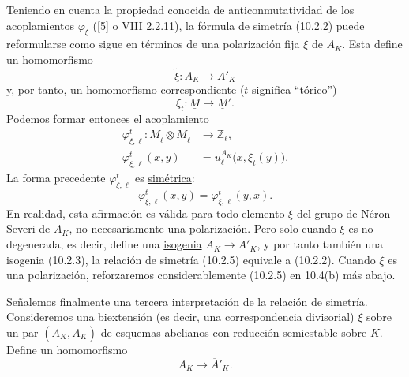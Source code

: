 Teniendo en cuenta la propiedad conocida de anticonmutatividad de los
acoplamientos $\varphi_\xi$ ([5] o VIII 2.2.11), la fórmula de simetría
(10.2.2) puede reformularse como sigue en términos de una polarización
fija $\xi$ de $A_K$. Esta define un homomorfismo
\begin{equation*}
\widetilde\xi:A_K\longrightarrow A'_K
\end{equation*}
y, por tanto, un homomorfismo correspondiente ($t$ significa
``tórico'')
\begin{equation}\tag{10.2.3}
\xi_t:\underline M\longrightarrow\underline M'.
\end{equation}
Podemos formar entonces el acoplamiento
\begin{equation}\tag{10.2.4}
\begin{aligned}
\varphi^t_{\xi,\ell}:\underline M_\ell\otimes\underline M_\ell
 &\longrightarrow\mathbb Z_\ell,\\
\varphi^t_{\xi,\ell}(x,y)&=u_\ell^{A_K}\bigl(x,\xi_t(y)\bigr).
\end{aligned}
\end{equation}
La forma precedente $\varphi^t_{\xi,\ell}$ es \underline{simétrica}:
\begin{equation}\tag{10.2.5}
\varphi^t_{\xi,\ell}(x,y)=\varphi^t_{\xi,\ell}(y,x).
\end{equation}
En realidad, esta afirmación es válida para todo elemento $\xi$ del
grupo de Néron--Severi de $A_K$, no necesariamente una polarización.
Pero solo cuando $\xi$ es no degenerada, es decir, define una
\underline{isogenia} $A_K\longrightarrow A'_K$, y por tanto también
una isogenia (10.2.3), la relación de simetría (10.2.5) equivale a
(10.2.2). Cuando $\xi$ es una polarización, reforzaremos
considerablemente (10.2.5) en 10.4(b) más abajo.

Señalemos finalmente una tercera interpretación de la relación de
simetría. Consideremos una biextensión (es decir, una correspondencia
divisorial) $\xi$ sobre un par $(A_K,\overline A_K)$ de esquemas
abelianos con reducción semiestable sobre $K$. Define un homomorfismo
\begin{equation*}
A_K\longrightarrow\overline A'_K.
\end{equation*}


